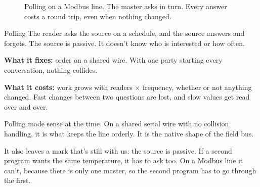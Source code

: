 \begin{figure}[htbp]
\centering
{}
\caption{Polling on a Modbus line. The master asks in turn. Every answer costs a
round trip, even when nothing changed.}
\end{figure}

\begin{concept}{Polling}
The reader asks the source on a schedule, and the source answers and forgets.
The source is passive. It doesn't know who is interested or how often.

\textbf{What it fixes:} order on a shared wire. With one party starting every
conversation, nothing collides.

\textbf{What it costs:} work grows with readers $\times$ frequency, whether or
not anything changed. Fast changes between two questions are lost, and slow
values get read over and over.
\end{concept}

Polling made sense at the time. On a shared serial wire with no collision
handling, it is what keeps the line orderly. It is the native shape of the field
bus.

It also leaves a mark that's still with us: the source is passive. If a second
program wants the same temperature, it has to ask too. On a Modbus line it
can't, because there is only one master, so the second program has to go
through the first.

